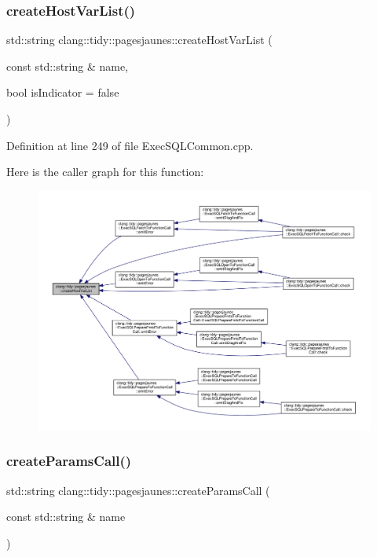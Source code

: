 \subsubsection{\texorpdfstring{create\+Host\+Var\+List()}{createHostVarList()}}
{\footnotesize\ttfamily std\+::string clang\+::tidy\+::pagesjaunes\+::create\+Host\+Var\+List (\begin{DoxyParamCaption}\item[{const std\+::string \&}]{name,  }\item[{bool}]{is\+Indicator = {\ttfamily false} }\end{DoxyParamCaption})}



Definition at line 249 of file Exec\+S\+Q\+L\+Common.\+cpp.

Here is the caller graph for this function\+:
\nopagebreak
\begin{figure}[H]
\begin{center}
\leavevmode
\includegraphics[width=350pt]{namespaceclang_1_1tidy_1_1pagesjaunes_aec0e9fb404aeca42708f76ae537048c6_icgraph}
\end{center}
\end{figure}
\mbox{\label{namespaceclang_1_1tidy_1_1pagesjaunes_ae8c5cda28d525b0b8a9cbbc4120275c8}} 
\subsubsection{\texorpdfstring{create\+Params\+Call()}{createParamsCall()}}
{\footnotesize\ttfamily std\+::string clang\+::tidy\+::pagesjaunes\+::create\+Params\+Call (\begin{DoxyParamCaption}\item[{const std\+::string \&}]{name }\end{DoxyParamCaption})}



